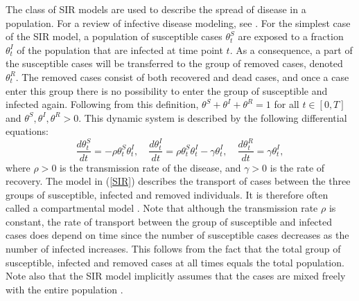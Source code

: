 \documentclass[10pt,a4paper]{article}
\begin{document}
The class of SIR models are used to describe the spread of disease in a population. For a review of infective disease modeling, see \cite{keeling2011modeling}. For the simplest case of the SIR model, a population of susceptible cases $\theta^S_t$ are exposed to a fraction $\theta^I_t$ of the population that are infected at time point $t$. As a consequence, a part of the susceptible cases will be transferred to the group of removed cases, denoted $\theta^R_t$. The removed cases consist of both recovered and dead cases, and once a case enter this group there is no possibility to enter the group of susceptible and infected again. Following from this definition, $\theta^S + \theta^I + \theta^R = 1$ for all $t \in [0,T]$ and $\theta^S, \theta^I, \theta^R > 0$. This dynamic system is described by the following differential equations: 
%
\begin{equation}\label{SIR}
	\frac{d\theta_t^S}{dt} = -\rho\theta_t^S\theta_t^I, \quad \frac{d\theta_t^I}{dt} = \rho\theta_t^S\theta_t^I - \gamma \theta_t^I, \quad \frac{d\theta_t^R}{dt} = \gamma \theta_t^I,
\end{equation}
%
where $\rho > 0$ is the transmission rate of the disease, and $\gamma > 0$ is the rate of recovery. The model in (\ref{SIR}) describes the transport of cases between the three groups of susceptible, infected and removed individuals. It is therefore often called a compartmental model \parencite{ramsay2017dynamic}. Note that although the transmission rate $\rho$ is constant, the rate of transport between the group of susceptible and infected cases does depend on time since the number of susceptible cases decreases as the number of infected increases. This follows from the fact that the total group of susceptible, infected and removed cases at all times equals the total population. Note also that the SIR model implicitly assumes that the cases are mixed freely with the entire population \parencite{ramsay2017dynamic}.
\end{document}
